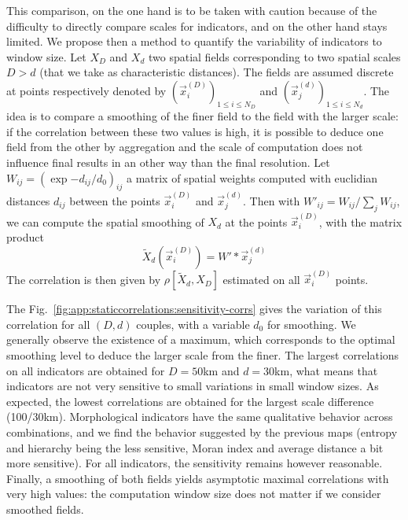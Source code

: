 This comparison, on the one hand is to be taken with caution because of the difficulty to directly compare scales for indicators, and on the other hand stays limited. We propose then a method to quantify the variability of indicators to window size. Let $X_D$ and $X_d$ two spatial fields corresponding to two spatial scales $D > d$ (that we take as characteristic distances). The fields are assumed discrete at points respectively denoted by $\left(\vec{x}_i^{(D)}\right)_{1 \leq i \leq N_D}$ and $\left(\vec{x}_j^{(d)}\right)_{1 \leq i \leq N_d}$. The idea is to compare a smoothing of the finer field to the field with the larger scale: if the correlation between these two values is high, it is possible to deduce one field from the other by aggregation and the scale of computation does not influence final results in an other way than the final resolution. Let $W_{ij} = \left( \exp{ - d_{ij} / d_0} \right)_{ij}$ a matrix of spatial weights computed with euclidian distances $d_{ij}$ between the points $\vec{x}_i^{(D)}$ and $\vec{x}_j^{(d)}$. Then with $W'_{ij} = W_{ij} / \sum_j W_{ij}$, we can compute the spatial smoothing of $X_d$ at the points $\vec{x}_i^{(D)}$, with the matrix product
\[
\tilde{X}_d (\vec{x}_i^{(D)}) = W' \ast \vec{x}_j^{(d)}
\]
The correlation is then given by $\rho\left[\tilde{X}_d,X_D\right]$ estimated on all $\vec{x}_i^{(D)}$ points.



The Fig.~\ref{fig:app:staticcorrelations:sensitivity-corrs} gives the variation of this correlation for all $(D,d)$ couples, with a variable $d_0$ for smoothing. We generally observe the existence of a maximum, which corresponds to the optimal smoothing level to deduce the larger scale from the finer. The largest correlations on all indicators are obtained for $D=50$km and $d=30$km, what means that indicators are not very sensitive to small variations in small window sizes. As expected, the lowest correlations are obtained for the largest scale difference (100/30km). Morphological indicators have the same qualitative behavior across combinations, and we find the behavior suggested by the previous maps (entropy and hierarchy being the less sensitive, Moran index and average distance a bit more sensitive). For all indicators, the sensitivity remains however reasonable. Finally, a smoothing of both fields yields asymptotic maximal correlations with very high values: the computation window size does not matter if we consider smoothed fields.



